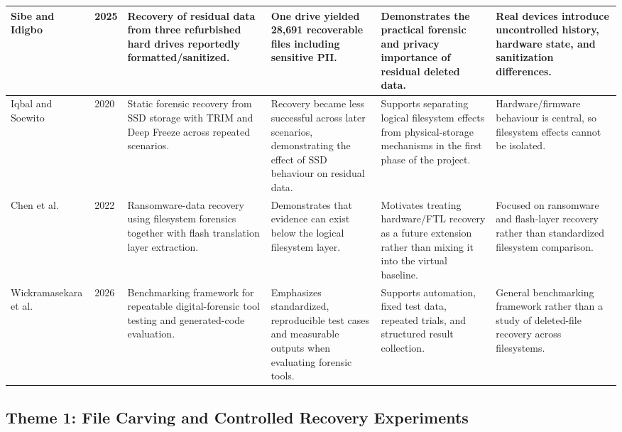 \documentclass[conference]{IEEEtran}
\begin{document}
\begin{table}[t]
\begin{tabularx}{\textwidth}{|p{2.15cm}|C{0.65cm}|>{\raggedright\arraybackslash}X|>{\raggedright\arraybackslash}X|>{\raggedright\arraybackslash}X|>{\raggedright\arraybackslash}X|}
\hline
Sibe and Idigbo \cite{sibe2025pii} & 2025 & Recovery of residual data from three refurbished hard drives reportedly formatted/sanitized. & One drive yielded 28,691 recoverable files including sensitive PII. & Demonstrates the practical forensic and privacy importance of residual deleted data. & Real devices introduce uncontrolled history, hardware state, and sanitization differences. \\
\hline
Iqbal and Soewito \cite{iqbal2020ssdtrim} & 2020 & Static forensic recovery from SSD storage with TRIM and Deep Freeze across repeated scenarios. & Recovery became less successful across later scenarios, demonstrating the effect of SSD behaviour on residual data. & Supports separating logical filesystem effects from physical-storage mechanisms in the first phase of the project. & Hardware/firmware behaviour is central, so filesystem effects cannot be isolated. \\
\hline
Chen et al. \cite{chen2022ransomware} & 2022 & Ransomware-data recovery using filesystem forensics together with flash translation layer extraction. & Demonstrates that evidence can exist below the logical filesystem layer. & Motivates treating hardware/FTL recovery as a future extension rather than mixing it into the virtual baseline. & Focused on ransomware and flash-layer recovery rather than standardized filesystem comparison. \\
\hline
Wickramasekara et al. \cite{wickramasekara2026autodfbench} & 2026 & Benchmarking framework for repeatable digital-forensic tool testing and generated-code evaluation. & Emphasizes standardized, reproducible test cases and measurable outputs when evaluating forensic tools. & Supports automation, fixed test data, repeated trials, and structured result collection. & General benchmarking framework rather than a study of deleted-file recovery across filesystems. \\
\hline
\end{tabularx}
\end{table}

\subsection{Theme 1: File Carving and Controlled Recovery Experiments}
\end{document}
